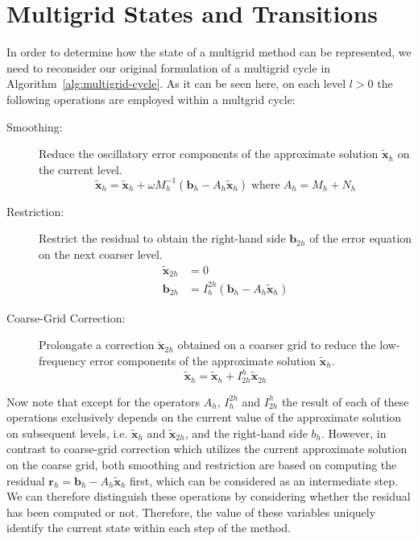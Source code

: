 \section{Multigrid States and Transitions}
In order to determine how the state of a multigrid method can be represented, we need to reconsider our original formulation of a multigrid cycle in Algorithm~\ref{alg:multigrid-cycle}.
As it can be seen here, on each level $l > 0$ the following operations are employed within a multgrid cycle:
\begin{description}
	\item[Smoothing:] Reduce the oscillatory error components of the approximate solution $\tilde{\bm{x}}_h$ on the current level. 
	\begin{equation*}
		\tilde{\bm{x}}_h = \tilde{\bm{x}}_h + \omega M_h^{-1} \left( \bm{b}_h - A_h \tilde{\bm{x}}_h \right) \; \text{where} \; A_h = M_h + N_h
	\end{equation*}
	\item[Restriction:] Restrict the residual to obtain the right-hand side $\bm{b}_{2h}$ of the error equation on the next coarser level.
	\begin{align*}
		\tilde{\bm{x}}_{2h} & = 0 \\
 		\bm{b}_{2h} & = I_h^{2h} (\bm{b}_h - A_h \tilde{\bm {x}}_h)
	\end{align*}
	\item[Coarse-Grid Correction:] Prolongate a correction $\tilde{\bm{x}}_{2h}$ obtained on a coarser grid to reduce the low-frequency error components of the approximate solution $\tilde{\bm{x}}_h$.
	\begin{equation*}
		\tilde{\bm{x}}_h = \tilde{\bm{x}}_h + I_{2h}^h \tilde{\bm{x}}_{2h}
	\end{equation*}
\end{description}
Now note that except for the operators $A_h$, $I_h^{2h}$ and $I_{2h}^h$ the result of each of these operations exclusively depends on the current value of the approximate solution on subsequent levels, i.e. $\tilde{\bm{x}}_{h}$ and $\tilde{\bm{x}}_{2h}$, and the right-hand side $b_h$.
However, in contrast to coarse-grid correction which utilizes the current approximate solution on the coarse grid, both smoothing and restriction are based on computing the residual $\bm{r}_h = \bm{b}_h - A_h \tilde{\bm {x}}_h$ first, which can be considered as an intermediate step.
We can therefore distinguish these operations by considering whether the residual has been computed or not.
Therefore, the value of these variables uniquely identify the current state within each step of the method.
